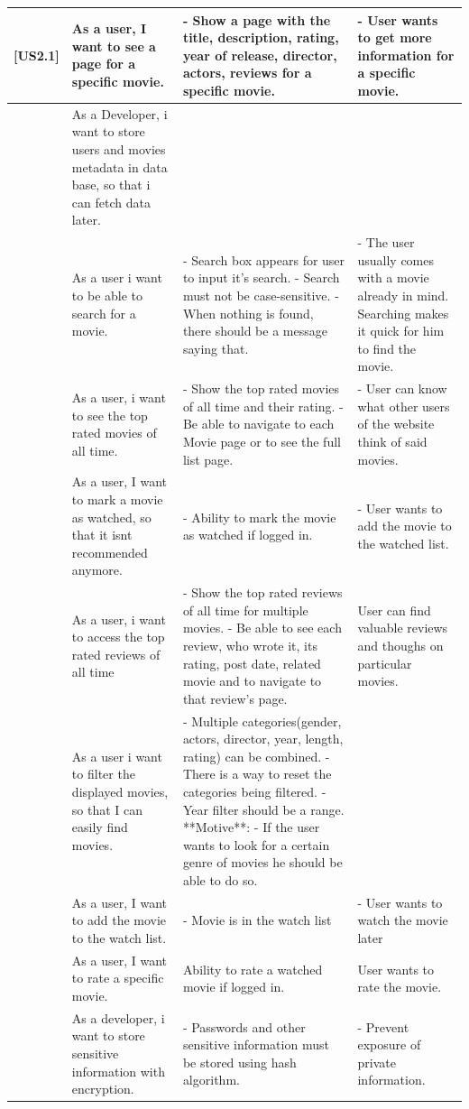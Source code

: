 \documentclass{article}
\begin{document}
\begin{longtable}{|p{1cm}|p{3cm}|p{6cm}|p{6cm}|}
[US2.1] & As a user, I want to see a page for a specific movie. & - Show a page with the title, description, rating, year of release, director, actors, reviews for a specific movie. & - User wants to get more information for a specific movie. \\ \hline
[US7.1] & As a Developer, i want to store users and movies metadata in data base, so that i can fetch data later. &  &  \\ \hline
[US3.2] & As a user i want to be able to search for a movie. & - Search box appears for user to input it's search.  - Search must not be case-sensitive.  - When nothing is found, there should be a message saying that. & - The user usually comes with a movie already in mind. Searching makes it quick for him to find the movie. \\ \hline
[US1.6] & As a user, i want to see the top rated movies of all time. & - Show the top rated movies of all time and their rating. - Be able to navigate to each Movie page or to see the full list page. & - User can know what other users of the website think of said movies. \\ \hline
[US2.2] & As a user, I want to mark a movie as watched, so that it isnt recommended anymore. & - Ability to mark the movie as watched if logged in. & - User wants to add the movie to the watched list. \\ \hline
[US1.7] & As a user, i want to access the top rated reviews of all time & - Show the top rated reviews of all time for multiple movies. - Be able to see each review, who wrote it, its rating, post date, related movie and to navigate to that review's page. & User can find valuable reviews and thoughs on particular movies. \\ \hline
[US3.3] & As a user i want to filter the displayed movies, so that I can easily find movies. & - Multiple categories(gender, actors, director, year, length, rating) can be combined. - There is a way to reset the categories being filtered. - Year filter should be a range.  **Motive**: - If the user wants to look for a certain genre of movies he should be able to do so. &  \\ \hline
[US2.3] & As a user, I want to add the movie to the watch list. & - Movie is in the watch list & - User wants to watch the movie later \\ \hline
[US2.4] & As a user, I want to rate a specific movie. & Ability to rate a watched movie if logged in. & User wants to rate the movie. \\ \hline
[US7.2] & As a developer, i want to store sensitive information with encryption. & - Passwords and other sensitive information must be stored using hash algorithm. & - Prevent exposure of private information. \\ \hline

\end{longtable}
\end{document}
